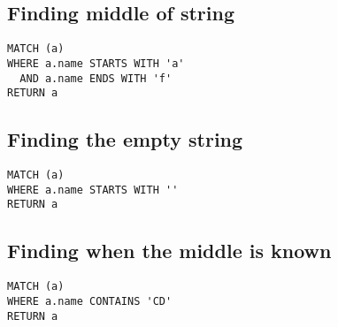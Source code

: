 \subsection{Finding middle of string}

\begin{lstlisting}
MATCH (a)
WHERE a.name STARTS WITH 'a'
  AND a.name ENDS WITH 'f'
RETURN a
\end{lstlisting}

\subsection{Finding the empty string}

\begin{lstlisting}
MATCH (a)
WHERE a.name STARTS WITH ''
RETURN a
\end{lstlisting}

\subsection{Finding when the middle is known}

\begin{lstlisting}
MATCH (a)
WHERE a.name CONTAINS 'CD'
RETURN a
\end{lstlisting}

